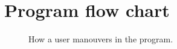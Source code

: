 
\section{Program flow chart}

\begin{figure}[ht]
	\capstart
	\def\svgwidth{\textwidth}
	
	\caption[Program flow chart]{How a user manouvers in the program.}
	\label{fig:program_flow_chart}
\end{figure}